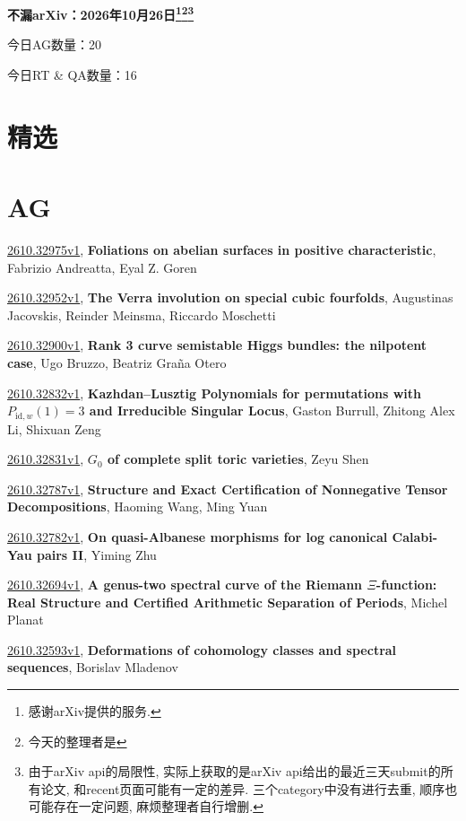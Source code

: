 \documentclass[9pt, a4paper]{article}
\theoremstyle{plain}
\theoremstyle{definition}
\theoremstyle{remark}
\newcommand{\arxiv}[3]{\href{https://arxiv.org/abs/#1}{#1}, \textbf{\textcolor{arxivblue}{#2}}, #3}
\newcommand{\AGnumber}{20}
\newcommand{\RTQAnumber}{16}
\newcommand{\NewestDate}{2026年10月26日}
\newcommand{\todayarXiver}{} %
\begin{document}
\begin{center}
    \Huge\textbf{不漏arXiv：\NewestDate\footnote{感谢arXiv提供的服务.}\footnote{今天的整理者是\todayarXiver}\footnote{由于arXiv api的局限性, 实际上获取的是arXiv api给出的最近三天submit的所有论文, 和recent页面可能有一定的差异. 三个category中没有进行去重, 顺序也可能存在一定问题, 麻烦整理者自行增删.}} \\
\end{center}

\setcounter{section}{-1}

\begin{center}
    今日AG数量：\AGnumber
    
    今日RT \& QA数量：\RTQAnumber
    
\end{center}


\section{精选}


\section{AG}
\arxiv{2610.32975v1}{Foliations on abelian surfaces in positive characteristic}{Fabrizio Andreatta, Eyal Z. Goren}

\arxiv{2610.32952v1}{The Verra involution on special cubic fourfolds}{Augustinas Jacovskis, Reinder Meinsma, Riccardo Moschetti}

\arxiv{2610.32900v1}{Rank 3 curve semistable Higgs bundles: the nilpotent case}{Ugo Bruzzo, Beatriz Graña Otero}

\arxiv{2610.32832v1}{Kazhdan--Lusztig Polynomials for permutations with $P_{\mathrm{id},w}(1)=3$ and Irreducible Singular Locus}{Gaston Burrull, Zhitong Alex Li, Shixuan Zeng}

\arxiv{2610.32831v1}{$G_0$ of complete split toric varieties}{Zeyu Shen}

\arxiv{2610.32787v1}{Structure and Exact Certification of Nonnegative Tensor Decompositions}{Haoming Wang, Ming Yuan}

\arxiv{2610.32782v1}{On quasi-Albanese morphisms for log canonical Calabi-Yau pairs II}{Yiming Zhu}

\arxiv{2610.32694v1}{A genus-two spectral curve of the Riemann $Ξ$-function: Real Structure and Certified Arithmetic Separation of Periods}{Michel Planat}

\arxiv{2610.32593v1}{Deformations of cohomology classes and spectral sequences}{Borislav Mladenov}
\end{document}
